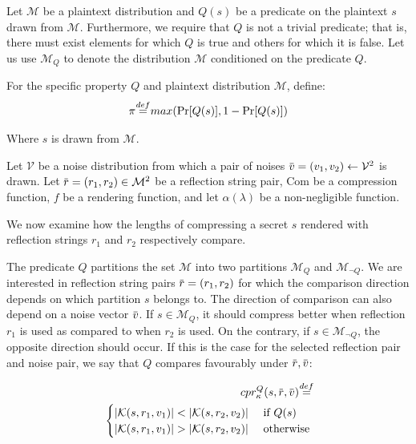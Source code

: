 \documentclass[conference, letterpaper, 10pt]{IEEEtran}
\newcommand\defeq{\stackrel{\mathclap{\normalfont\mbox{def}}}{=}}
\newcommand{\overbar}[1]{\mkern 1.5mu\overline{\mkern-1.5mu#1\mkern-1.5mu}\mkern 1.5mu}
\begin{document}
Let $\mathcal{M}$ be a plaintext distribution and $Q(s)$ be a predicate on the
plaintext $s$ drawn from $\mathcal{M}$. Furthermore, we require that $Q$ is not a
trivial predicate; that is, there must exist elements for which $Q$ is true and
others for which it is false.  Let us use $\mathcal{M}_Q$ to denote the
distribution $\mathcal{M}$ conditioned on the predicate $Q$.

For the specific property $Q$ and plaintext distribution $\mathcal{M}$, define:
\begin{equation*}
    \pi \defeq max(\Pr[Q(s)], 1 - \Pr[Q(s)])
\end{equation*}

Where $s$ is drawn from $\mathcal{M}$.

Let $\mathcal{V}$ be a noise distribution from which a pair of noises
$\overbar{v} = (v_1, v_2) \leftarrow \mathcal{V}^2$ is drawn.  Let $\overbar{r}
= (r_1, r_2) \in \mathcal{M}^2$ be a reflection string pair, $\textrm{Com}$ be a
compression function, $f$ be a rendering function, and let $\alpha(\lambda)$ be
a non-negligible function.

We now examine how the lengths of compressing a secret $s$ rendered with
reflection strings $r_1$ and $r_2$ respectively compare.

The predicate $Q$ partitions the set $\mathcal{M}$ into two partitions
$\mathcal{M}_Q$ and $\mathcal{M}_{\lnot Q}$. We are interested in reflection
string pairs $\overbar{r} = (r_1, r_2)$ for which the comparison direction
depends on which partition $s$ belongs to.  The direction of comparison can
also depend on a noise vector $\overbar{v}$.  If $s \in \mathcal{M}_Q$, it
should compress better when reflection $r_1$ is used as compared to when $r_2$
is used. On the contrary, if $s \in \mathcal{M}_{\lnot Q}$, the opposite
direction should occur.  If this is the case for the selected reflection pair
and noise pair, we say that $Q$ compares favourably under $\overbar{r},
\overbar{v}$:

\begin{equation*}
\begin{split}
    cpr^Q_{\kappa}(s, \overbar{r}, \overbar{v})
    \defeq\\
    \begin{cases}
        |\mathcal{K}(s, r_1, v_1)| < |\mathcal{K}(s, r_2, v_2)| &\text{ if } Q(s)\\
        |\mathcal{K}(s, r_1, v_1)| > |\mathcal{K}(s, r_2, v_2)| &\text{ otherwise}
    \end{cases}
\end{split}
\end{equation*}
\end{document}

